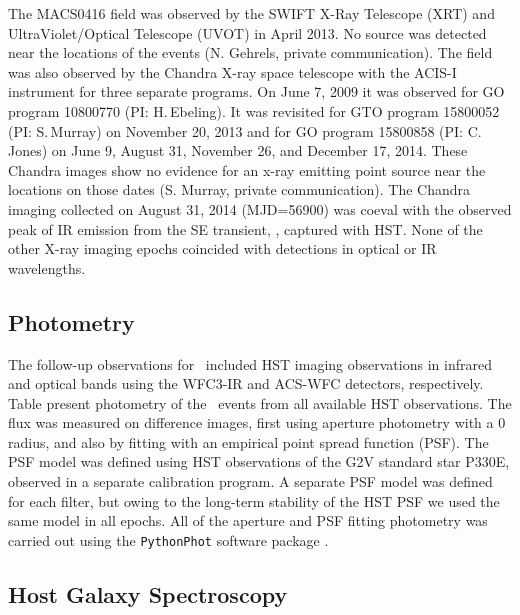 The MACS0416 field was observed by the SWIFT X-Ray Telescope (XRT) and
UltraViolet/Optical Telescope (UVOT) in April 2013.  No source was
detected near the locations of the \spock events (N. Gehrels, private
communication).  The field was also observed by the Chandra X-ray
space telescope with the ACIS-I instrument for three separate
programs.  On June 7, 2009 it was observed for GO program 10800770
(PI: H.\,Ebeling).  It was revisited for GTO program 15800052 (PI:
S.\,Murray) on November 20, 2013 and for GO program 15800858 (PI: C.\,
Jones) on June 9, August 31, November 26, and December 17, 2014. These
Chandra images show no evidence for an x-ray emitting point source
near the \spock locations on those dates (S. Murray, private
communication). The Chandra imaging collected on August 31, 2014
(MJD=56900) was coeval with the observed peak of IR emission from
the SE transient, \spocktwo, captured with HST.  None of the other
X-ray imaging epochs coincided with \spock detections in optical or IR
wavelengths.


\subsection{Photometry}\label{sec:Photometry}

The follow-up observations for \spock\ included HST imaging
observations in infrared and optical bands using the WFC3-IR and
ACS-WFC detectors, respectively. Table  %
present photometry of the \spock\ events from all available HST
observations. The flux was measured on difference images, first using
aperture photometry with a 0 radius, and also by fitting with
an empirical point spread function (PSF).  The PSF model was defined
using HST observations of the G2V standard star P330E, observed in a
separate calibration program.  A separate PSF model was defined for
each filter, but owing to the long-term stability of the HST PSF we
used the same model in all epochs.  All of the aperture and PSF
fitting photometry was carried out using the {\tt PythonPhot} software
package \citep{Jones:2015}.

\subsection{Host Galaxy Spectroscopy}\label{sec:Spectroscopy}

